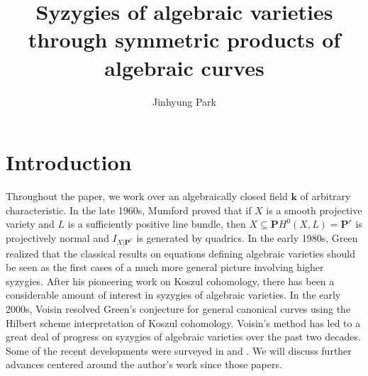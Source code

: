 \documentclass[graybox]{svmult}
\newcommand{\kk}{\mathbf{k}}
\def\nP{\mathbf{P}}
\begin{document}
\title*{Syzygies of algebraic varieties through symmetric products of algebraic curves}
\author{Jinhyung Park}
%
%
\maketitle



\section{Introduction}

Throughout the paper, we work over an algebraically closed field $\kk$ of arbitrary characteristic. 
In the late 1960s, Mumford \cite{Mumford} proved that if $X$ is a smooth projective variety and $L$ is a sufficiently positive line bundle, then $X \subseteq \nP H^0(X, L) = \nP^r$ is projectively normal and $I_{X|\nP^r}$ is generated by quadrics. In the early 1980s, Green realized that the classical results on equations defining algebraic varieties should be seen as the first cases of a much more general picture involving higher syzygies. After his pioneering work \cite{Green1, Green2} on Koszul cohomology, there has been a considerable amount of interest in syzygies of algebraic varieties. In the early 2000s, Voisin \cite{Voisin1, Voisin2} resolved Green's conjecture for general canonical curves using the Hilbert scheme interpretation of Koszul cohomology. Voisin's method has led to a great deal of progress on syzygies of algebraic varieties over the past two decades. Some of the recent developments were surveyed in \cite{EL3} and \cite{Farkas1}. We will discuss further advances centered around the author's work since those papers.
\end{document}
